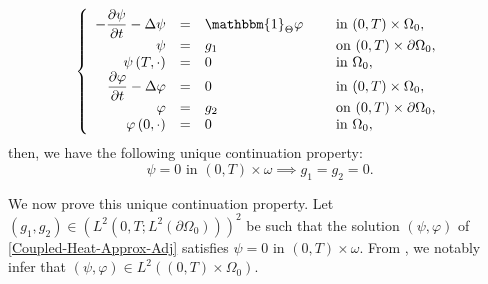 \begin{equation}
\label{Coupled-Heat-Approx-Adj}
\left\{
\begin{array}{rcll}
-\dfrac{\partial \psi}{\partial t}-\Delta \psi &=&\mathbbm{1}_{\Theta}\varphi \quad&\text{ in }(0,T) \times \Omega_0,
\\
\psi &=& g_1 &\text{ on }(0,T) \times \partial \Omega_0,
\\
\psi \left(T,\cdot\right) &=& 0 &\text{ in }\Omega_0,
\\
\dfrac{\partial \varphi}{\partial t}-\Delta \varphi &=& 0 &\text{ in }(0,T) \times \Omega_0,
\\
\varphi &=& g_2 &\text{ on }(0,T) \times \partial \Omega_0,
\\
\varphi\left(0,\cdot\right) &=& 0 &\text{ in }\Omega_0,
\end{array}
\right.
\end{equation}
then, we have the following unique continuation property:
\begin{equation}
\label{UC-Adj-Coupled}
\psi = 0 \text{ in } (0,T) \times \omega \implies g_1 = g_2 = 0.
\end{equation}

We now prove this unique continuation property. Let $(g_1, g_2) \in (L^2(0,T; L^2(\partial\Omega_0)))^2$ be such that the solution $(\psi, \varphi)$ of \eqref{Coupled-Heat-Approx-Adj} satisfies $\psi = 0$ in $(0,T) \times \omega$. From \cite[(15.17--18), p.\,86]{LionsMagenes2}, we notably infer that $(\psi,\varphi)\in L^2((0,T)\times\Omega_0)$.

